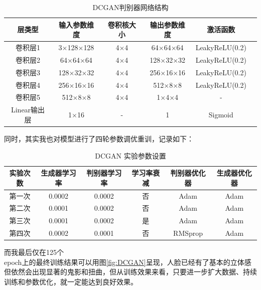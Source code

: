 \documentclass[UTF8]{ctexart}
\begin{document}
\begin{table}[htbp]
    \centering
    \caption{DCGAN判别器网络结构}
    \label{tab:dis_dcgan}
    \begin{tabular}{cccccc}
    \toprule[1.5pt]
    \textbf{层类型} & \textbf{输入参数维度} & \textbf{卷积核大小} & \textbf{输出参数维度} & \textbf{激活函数} \\
    \midrule[1.5pt]
    卷积层1 & 3$\times$128$\times$128 & 4$\times$4 & 64$\times$64$\times$64 & LeakyReLU(0.2) \\
    卷积层2 & 64$\times$64$\times$64 & 4$\times$4 & 128$\times$32$\times$32 & LeakyReLU(0.2) \\
    卷积层3 & 128$\times$32$\times$32 & 4$\times$4 & 256$\times$16$\times$16 & LeakyReLU(0.2) \\
    卷积层4 & 256$\times$16$\times$16 & 4$\times$4 & 512$\times$8$\times$8 & LeakyReLU(0.2) \\
    卷积层5 & 512$\times$8$\times$8 & 4$\times$4 & 1$\times$4$\times$4 & - \\
    Linear输出层 & 1$\times$16 & - & 1 & Sigmoid \\
    \bottomrule[1.0pt]
    \end{tabular}
\end{table}
同时，其实我也对模型进行了四轮参数调优重训，记录如下：
\begin{table}[H]
    \centering
    \caption{DCGAN 实验参数设置}
    \label{tab:dcgan_experiments}
    \small %
    \setlength{\tabcolsep}{4pt}
    \begin{tabular}{cccccc}
    \toprule[1.5pt]
    \textbf{实验次数} & \textbf{生成器学习率} & \textbf{判别器学习率} & \textbf{学习率衰减} & \textbf{判别器优化器} & \textbf{生成器优化器} \\
    \midrule[1.5pt]
    第一次 & 0.0002 & 0.0002 & 否 & Adam & Adam \\
    第二次 & 0.0001 & 0.0002 & 否 & Adam & Adam \\
    第三次 & 0.0001 & 0.0002 & 是 & Adam & Adam \\
    第四次 & 0.0002 & 0.0001 & 否 & RMSprop & Adam \\
    \bottomrule[1.0pt]
    \end{tabular}
\end{table}
而我最后仅在125个\\epoch上的最终训练结果可以用图\ref{fig:DCGAN}呈现，人脸已经有了基本的立体感但依然会出现显著的鬼影和扭曲，但从训练效果来看，只要进一步扩大数据、持续训练和参数优化，就一定能达到良好效果。
\end{document}

